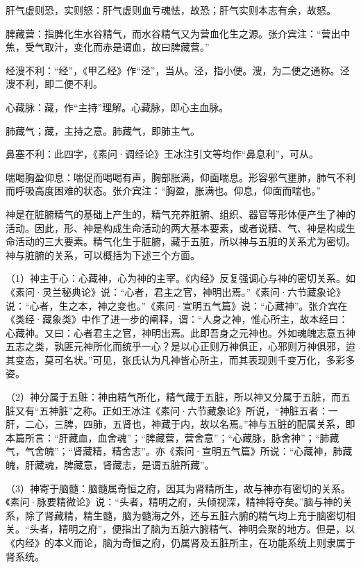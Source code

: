 \documentclass[12pt]{ctexbook}
\begin{document}
\begin{jiaozhu}
	\item 肝气虚则恐，实则怒：肝气虚则血亏魂怯，故恐；肝气实则本志有余，故怒。
	\item 脾藏营：指脾化生水谷精气，而水谷精气又为营血化生之源。张介宾注：“营出中焦，受气取汁，变化而赤是谓血，故曰脾藏营。”
	\item 经溲不利：“经”，《甲乙经》作“泾”，当从。泾，指小便。溲，为二便之通称。泾溲不利，即二便不利。
	\item 心藏脉：藏，作“主持”理解。心藏脉，即心主血脉。
	\item 肺藏气；藏，主持之意。肺藏气，即肺主气。
	\item 鼻塞不利：此四字，《素问·调经论》王冰注引文等均作“鼻息利”，可从。
	\item 喘喝胸盈仰息：喘促而喝喝有声，胸部胀满，仰面喘息。形容邪气壅肺，肺气不利而呼吸高度困难的状态。张介宾注：“胸盈，胀满也。仰息，仰面而喘也。”
\end{jiaozhu}



神是在脏腑精气的基础上产生的，精气充养脏腑、组织、器官等形体便产生了神的活动。因此，形、神是构成生命活动的两大基本要素，或者说精、气、神是构成生命活动的三大要素。精气化生于脏腑，藏于五脏，所以神与五脏的关系尤为密切。神与脏腑的关系，可以概括为下述三个方面。

（1）神主于心：心藏神，心为神的主宰。《内经》反复强调心与神的密切关系。如《素问·灵兰秘典论》说：“心者，君主之官，神明出焉。”《素问·六节藏象论》说：“心者，生之本，神之变也。”《素问·宣明五气篇》说：“心藏神”。张介宾在《类经·藏象类》中作了进一步的阐释，谓：“人身之神，惟心所主，故本经曰：心藏神。又曰：心者君主之官，神明出焉。此即吾身之元神也。外如魂魄志意五神五志之类，孰匪元神所化而统乎一心？是以心正则万神俱正，心邪则万神俱邪，迨其变态，莫可名状。”可见，张氏认为凡神皆心所主，而其表现则千变万化，多彩多姿。

（2）神分属于五赃：神由精气所化，精气藏于五脏，所以神又分属于五脏，而五脏又有“五神脏”之称。正如王冰注《素问·六节藏象论》所说，“神脏五者：一肝，二心，三脾，四肺，五肾也，神藏于内，故以名焉。”神与五脏的配属关系，即本篇所言：“肝藏血，血舍魂”；“脾藏营，营舍意”；“心藏脉，脉舍神”；“肺藏气，气舍魄”；“肾藏精，精舍志”。亦《素问·宣明五气篇》所说：“心藏神，肺藏魄，肝藏魂，脾藏意，肾藏志，是谓五脏所藏”。

（3）神寄于脑髓：脑髓属奇恒之府，因其为肾精所生，故与神亦有密切的关系。《素问·脉要精微论》说：“头者，精明之府，头倾视深，精神将夺矣。”脑与神的关系，除了肾藏精，精生髓，脑为髓海之外，还与五脏六腑的精气均上充于脑密切相关。“头者，精明之府”，便指出了脑为五脏六腑精气、神明会聚的地方。但是，以《内经》的本义而论，脑为奇恒之府，仍属肾及五脏所主，在功能系统上则隶属于肾系统。
\end{document}

